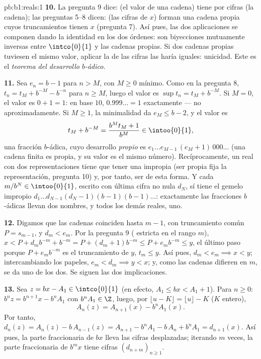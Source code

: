 \begin{solution}{pb:b1:reals:1}
\textbf{10.} La pregunta 9 dice: (el valor de una cadena) tiene por
cifras (la cadena); las preguntas 5--8 dicen: (las cifras de $x$)
forman una cadena propia cuyos truncamientos tienen  $x$
(pregunta 7). Así pues, las dos aplicaciones se componen dando la
identidad en los dos órdenes: son biyecciones mutuamente inversas
entre $\intco{0}{1}$ y las cadenas propias. Si dos cadenas propias
tuviesen el mismo valor, aplicar la  de las cifras las
haría iguales: unicidad. Este es el \emph{teorema del desarrollo
$b$-ádico}.

\textbf{11.} Sea $e_n = b - 1$ para $n > M$, con $M \geq 0$ mínimo.
Como en la pregunta 8, $t_n = t_M + b^{-M} - b^{-n}$ para $n \geq M$,
luego el valor es $\sup t_n = t_M + b^{-M}$. Si $M = 0$, el valor es
$0 + 1 = 1$: en base $10$, $0.999\dots = 1$ exactamente --- no
aproximadamente. Si $M \geq 1$, la minimalidad da $e_M \leq b - 2$, y
el valor es
\[
t_M + b^{-M} = \frac{b^M t_M + 1}{b^M} \in \intoo{0}{1},
\]
una fracción $b$-ádica, cuyo desarrollo \emph{propio} es
$e_1 \dots e_{M-1}\,(e_M + 1)\,000\dots$ (una cadena finita es propia,
y su valor es el mismo número). Recíprocamente, un real con dos
representaciones tiene que tener una impropia (ser propia fija la
representación, pregunta 10) y, por tanto, ser de esta forma. Y cada
$m/b^N \in \intoo{0}{1}$, escrito con última cifra no nula $d_N$, sí
tiene el gemelo impropio $d_1 \dots d_{N-1}(d_N - 1)(b-1)(b-1)\dots$:
exactamente las fracciones $b$-ádicas llevan dos nombres, y todos los
demás reales, uno.

\textbf{12.} Digamos que las cadenas coinciden hasta $m - 1$, con
truncamiento común $P = s_{m-1}$, y $d_m < e_m$. Por la pregunta 9
( estricta en el rango $m$), $x < P + d_m b^{-m} + b^{-m}
= P + (d_m + 1)b^{-m} \leq P + e_m b^{-m} \leq y$, el último paso
porque $P + e_m b^{-m}$ es el truncamiento de $y$, $t_m \leq y$. Así
pues, $d_m < e_m \implies x < y$; intercambiando los papeles,
$e_m < d_m \implies y < x$; y, como las cadenas difieren en $m$, se da
uno de los dos. Se siguen las dos implicaciones.

\textbf{13.} Sea $z = bx - A_1 \in \intco{0}{1}$ (en efecto,
$A_1 \leq bx < A_1 + 1$). Para $n \geq 0$: $b^n z = b^{n+1} x - b^n
A_1$ con $b^n A_1 \in \Z$, luego, por $\lfloor u - K \rfloor =
\lfloor u \rfloor - K$ ($K$ entero),
\[
A_n(z) = A_{n+1}(x) - b^n A_1(x) .
\]
Por tanto, $d_n(z) = A_n(z) - b\,A_{n-1}(z) = A_{n+1} - b^n A_1 -
b\,A_n + b^n A_1 = d_{n+1}(x)$. Así pues, la parte fraccionaria de $bx$
lleva las cifras desplazadas; iterando $m$ veces, la parte fraccionaria
de $b^m x$ tiene cifras $(d_{n+m})_{n \geq 1}$.


\end{solution}
